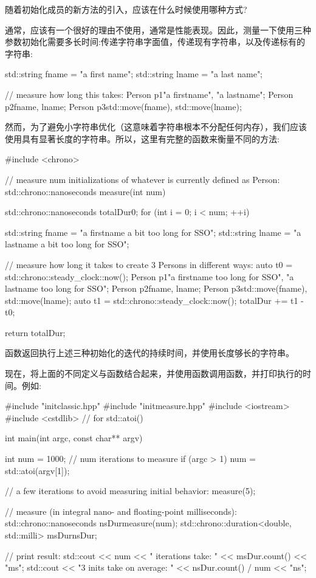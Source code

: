随着初始化成员的新方法的引入，应该在什么时候使用哪种方式?

通常，应该有一个很好的理由不使用，通常是性能表现。因此，测量一下使用三种参数初始化需要多长时间:传递字符串字面值，传递现有字符串，以及传递标有的字符串:

\begin{cppcode}
std::string fname = "a first name";
std::string lname = "a last name";

// measure how long this takes:
Person p1{"a firstname", "a lastname"};
Person p2{fname, lname};
Person p3{std::move(fname), std::move(lname)};
\end{cppcode}

然而，为了避免小字符串优化（这意味着字符串根本不分配任何内存），我们应该使用具有显著长度的字符串。所以，这里有完整的函数来衡量不同的方法:

\begin{cppcode}
#include <chrono>

// measure num initializations of whatever is currently defined as Person:
std::chrono::nanoseconds measure(int num)
{
	std::chrono::nanoseconds totalDur{0};
	for (int i = 0; i < num; ++i) {
		std::string fname = "a firstname a bit too long for SSO";
		std::string lname = "a lastname a bit too long for SSO";

		// measure how long it takes to create 3 Persons in different ways:
		auto t0 = std::chrono::steady_clock::now();
		Person p1{"a firstname too long for SSO", "a lastname too long for SSO"};
		Person p2{fname, lname};
		Person p3{std::move(fname), std::move(lname)};
		auto t1 = std::chrono::steady_clock::now();
		totalDur += t1 - t0;
	}
	return totalDur;
}
\end{cppcode}

函数返回执行上述三种初始化的迭代的持续时间，并使用长度够长的字符串。

现在，将上面的不同定义与函数结合起来，并使用函数调用函数，并打印执行的时间。例如:

\begin{cppcode}
#include "initclassic.hpp"
#include "initmeasure.hpp"
#include <iostream>
#include <cstdlib> // for std::atoi()

int main(int argc, const char** argv)
{
	int num = 1000; // num iterations to measure
	if (argc > 1) {
		num = std::atoi(argv[1]);
	}

	// a few iterations to avoid measuring initial behavior:
	measure(5);

	// measure (in integral nano- and floating-point milliseconds):
	std::chrono::nanoseconds nsDur{measure(num)};
	std::chrono::duration<double, std::milli> msDur{nsDur};

	// print result:
	std::cout << num << " iterations take: "
	<< msDur.count() << "ms\n";
	std::cout << "3 inits take on average: "
	<< nsDur.count() / num << "ns\n";
}
\end{cppcode}

